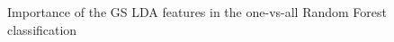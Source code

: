 \documentclass[twoside]{article}
\begin{document}
\begin{multicols}{2}
\begin{figure}[H]
\centering
{}
\quad
{}
\quad
{}
%
\caption{Importance of the GS LDA features in the one-vs-all Random Forest classification}
\label{fig:figure}
\end{figure}


\end{multicols}
\end{document}
